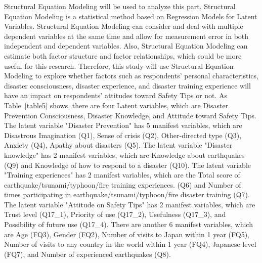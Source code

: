 Structural Equation Modeling will be used to analyze this part. Structural Equation Modeling is a statistical method based on Regression Models for Latent Variables. Structural Equation Modeling can consider and deal with multiple dependent variables at the same time and allow for measurement error in both independent and dependent variables. Also, Structural Equation Modeling can estimate both factor structure and factor relationships, which could be more useful for this research. Therefore, this study will use Structural Equation Modeling to explore whether factors such as respondents' personal characteristics, disaster consciousness, disaster experience, and disaster training experience will have an impact on respondents' attitudes toward Safety Tips or not. As Table~\ref{table5} shows, there are four Latent variables, which are Disaster Prevention Consciousness, Disaster Knowledge, and Attitude toward Safety Tips. The latent variable "Disaster Prevention" has 5 manifest variables, which are Disastrous Imagination (Q1), Sense of crisis (Q2), Other-directed type (Q3), Anxiety (Q4), Apathy about disasters (Q5). The latent variable "Disaster knowledge" has 2 manifest variables, which are Knowledge about earthquakes (Q9) and Knowledge of how to respond to a disaster (Q10). The latent variable "Training experiences" has 2 manifest variables, which are the Total score of earthquake/tsunami/typhoon/fire training experiences. (Q6) and Number of times participating in earthquake/tsunami/typhoon/fire disaster training (Q7). The latent variable "Attitude on Safety Tips" has 2 manifest variables, which are Trust level (Q17\_1), Priority of use (Q17\_2), Usefulness (Q17\_3), and Possibility of future use (Q17\_4). There are another 6 manifest variables, which are Age (FQ3), Gender (FQ2), Number of visits to Japan within 1 year (FQ5), Number of visits to any country in the world within 1 year (FQ4), Japanese level (FQ7), and Number of experienced earthquakes (Q8).

